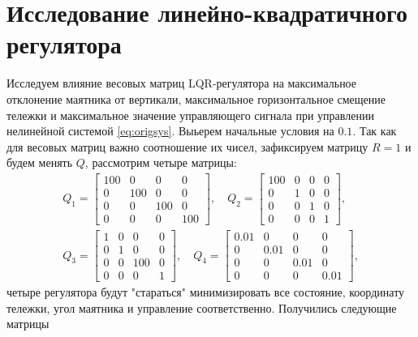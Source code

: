 \section{Исследование линейно-квадратичного регулятора}

Исследуем влияние весовых матриц LQR-регулятора на максимальное отклонение 
маятника от вертикали, максимальное горизонтальное смещение тележки и 
максимальное значение управляющего сигнала при управлении нелинейной 
системой \eqref{eq:origsys}. Выьерем начальные условия на $0.1$.
Так как для весовых матриц важно соотношение их чисел, зафиксируем матрицу
$R=1$ и будем менять $Q$, рассмотрим четыре матрицы:
\begin{gather*}
Q_1 = \begin{bmatrix}
100 & 0 & 0 & 0 \\
0 & 100 & 0 & 0 \\
0 & 0 & 100 & 0 \\
0 & 0 & 0 & 100
\end{bmatrix},\quad
Q_2 = \begin{bmatrix}
100 & 0 & 0 & 0 \\
0 & 1 & 0 & 0 \\
0 & 0 & 1 & 0 \\
0 & 0 & 0 & 1
\end{bmatrix},\\
Q_3 = \begin{bmatrix}
1 & 0 & 0 & 0 \\
0 & 1 & 0 & 0 \\
0 & 0 & 100 & 0 \\
0 & 0 & 0 & 1
\end{bmatrix},\quad
Q_4 = \begin{bmatrix}
0.01 & 0 & 0 & 0 \\
0 & 0.01 & 0 & 0 \\
0 & 0 & 0.01 & 0 \\
0 & 0 & 0 & 0.01
\end{bmatrix},
\end{gather*}
четыре регулятора будут "стараться" минимизировать все состояние, координату
тележки, угол маятника и управление соответственно. Получились следующие матрицы
